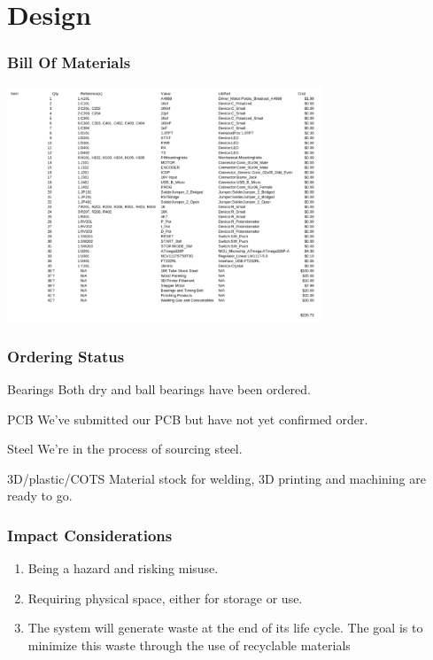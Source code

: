 \documentclass[aspectratio=169]{beamer}
\begin{document}
\section{Design}
\begin{frame}
    \frametitle{Bill Of Materials}

    \includegraphics[height=7cm]{BOMTable}

\end{frame}

\begin{frame}
    \frametitle{Ordering Status}

    \begin{block}{Bearings}
        Both dry and ball bearings have been ordered.
    \end{block}

    \begin{block}{PCB}
        We've submitted our PCB but have not yet confirmed order.
    \end{block}

    \begin{block}{Steel}
        We're in the process of sourcing steel.
    \end{block}

    \begin{block}{3D/plastic/COTS}
        Material stock for welding, 3D printing and machining are ready to go.
    \end{block}
\end{frame}


\begin{frame}
    \frametitle{Impact Considerations}

    \begin{enumerate}
        \item Being a hazard and risking misuse.
        \item Requiring physical space, either for storage or use.
        \item The system will generate waste at the end of its life cycle. The goal is to minimize this waste through the use of recyclable materials
    \end{enumerate}

\end{frame}
\end{document}
